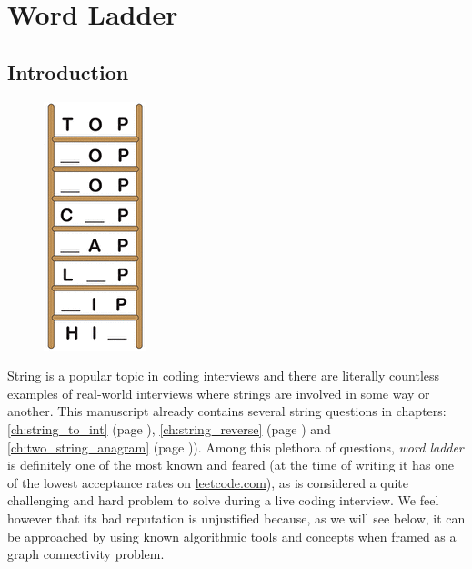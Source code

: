 %



\chapter{Word Ladder}
\label{ch:word_ladder}
\section*{Introduction}
\begin{figure}
    \vspace{-30pt}
    \begin{center}
        \includegraphics[scale=0.5]{sources/word_ladder/images/top-word-ladder}
    \end{center}
  \end{figure}
String is a popular topic in coding interviews and there are literally countless examples of real-world interviews where strings are involved in some way or another.
This manuscript already contains several string questions in chapters: \ref{ch:string_to_int} (page \pageref{ch:string_to_int}), \ref{ch:string_reverse} (page \pageref{ch:string_reverse}) and \ref{ch:two_string_anagram} (page \pageref{ch:two_string_anagram})).
Among this plethora of questions, \textit{word ladder} is definitely one of the most known and feared (at the time of writing it has one of the lowest acceptance rates on \href{https://leetcode.com/problems/word-ladder/}{leetcode.com}), as is considered a quite challenging and hard problem to solve during a live coding interview. 
We feel however that its bad reputation is unjustified because, as we will see below, it can be approached by using known algorithmic tools and concepts when framed as a graph connectivity problem.


